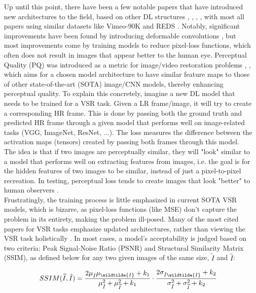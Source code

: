 \documentclass{article}
\begin{document}
Up until this point, there have been a few notable papers that have introduced new architectures to the field, based on other DL structures \cite{chan_basicvsr_2021}, \cite{chan_basicvsr_2022}, \cite{liang_recurrent_nodate}, \cite{rota_enhancing_2023}, with most all papers using similar datasets like Vimeo-90K \cite{xue_video_2019} and REDS \cite{nah_ntire_2021}. Notably, significant improvements have been found by introducing deformable convolutions \cite{dai_deformable_2016}, but most improvements come by training models to reduce pixel-loss functions, which often does not result in images that appear better to the human eye. Perceptual Quality (PQ) was introduced as a metric for image/video restoration problems \cite{johnson_perceptual_2016}, \cite{zhang_unreasonable_2018}, which aims for a chosen model architecture to have similar feature maps to those of other state-of-the-art (SOTA) image/CNN models, thereby enhancing perceptual quality. To explain this concretely, imagine a new DL model that needs to be trained for a VSR task. Given a LR frame/image, it will try to create a corresponding HR frame.  This is done by passing both the ground truth and predicted HR frame through a given model that performs well on image-related tasks (VGG, ImageNet, ResNet, ...). The loss measures the difference between the activation maps (tensors) created by passing both frames through this model. The idea is that if two images are perceptually similar, they will "look" similar to a model that performs well on extracting features from images, i.e. the goal is for the hidden features of two images to be similar, instead of just a pixel-to-pixel recreation. In testing, perceptual loss tends to create images that look "better" to human observers \cite{zhang_unreasonable_2018}. \\ %

Frustratingly, the training process is little emphasized in current SOTA VSR models, which is bizarre, as pixel-loss functions (like MSE) don’t capture the problem in its entirety, making the problem ill-posed. Many of the most cited papers for VSR tasks emphasize updated architectures, rather than viewing the VSR task holistically \cite{liu_video_2022}. In most cases, a model's acceptability is judged based on two criteria: Peak Signal-Noise Ratio (PSNR) and Structural Similarity Matrix (SSIM), as defined below for any two given images of the same size, \(\widetilde{I}\) and \(\hat{I}\): 

\begin{equation}
    SSIM(\widetilde{I}, \hat{I}) = \frac{
        2 \mu_{\hat{I}} \mu_{\wildtilde{I}} + k_1}{
        \mu^2_{\hat{I}} + \mu^2_{\widetilde{I}} + k_1}
        \cdot
        \frac{
        2 \sigma_{\hat{I} \wildtilde{I}} + k_2
        }{ \sigma^2_{\hat{I}} + \sigma^2_{\widetilde{I}} + k_2}
\end{equation}
\end{document}
